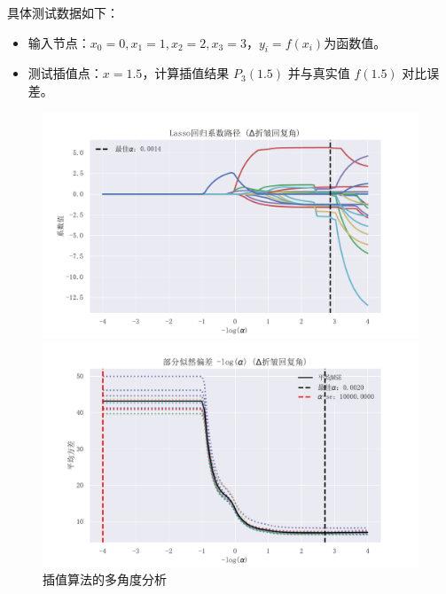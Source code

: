 \documentclass{joulabreport}
\begin{document}
具体测试数据如下：
\begin{itemize}
\item 输入节点：$x_0=0, x_1=1, x_2=2, x_3=3$，$y_i=f(x_i)$为函数值。
\item 测试插值点：$x=1.5$，计算插值结果 $P_3(1.5)$ 并与真实值 $f(1.5)$ 对比误差。
\end{itemize}

\begin{figure}[htbp]
    \centering
    \begin{minipage}[t]{0.45\textwidth}
        \centering
        \includegraphics[width=\textwidth]{figure/minipage1.pdf}
    \end{minipage}
    \hfill
    \begin{minipage}[t]{0.45\textwidth}
        \centering
        \includegraphics[width=\textwidth]{figure/minipage2.pdf}
    \end{minipage}
    \caption{插值算法的多角度分析}
    \label{fig:analysis}
\end{figure}
\end{document}
